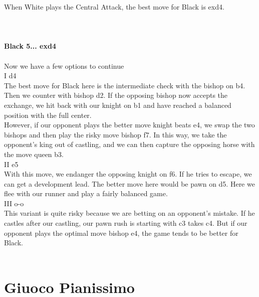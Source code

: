 \documentclass{article}
\begin{document}
When White plays the Central Attack, the best move for Black is exd4.\\
\\

\\
\\
\textbf{Black 5... exd4}\\
\\
Now we have a few options to continue\\I d4\\The best move for Black here is the intermediate check with the bishop on b4. Then we counter with bishop d2. If the opposing bishop now accepts the exchange, we hit back with our knight on b1 and have reached a balanced position with the full center.\\However, if our opponent plays the better move knight beats e4, we swap the two bishops and then play the risky move bishop f7. In this way, we take the opponent's king out of castling, and we can then capture the opposing horse with the move queen b3.\\II e5\\With this move, we endanger the opposing knight on f6. If he tries to escape, we can get a development lead. The better move here would be pawn on d5. Here we flee with our runner and play a fairly balanced game.\\III o-o\\This variant is quite risky because we are betting on an opponent's mistake. If he castles after our castling, our pawn rush is starting with c3 takes c4. But if our opponent plays the optimal move bishop e4, the game tends to be better for Black.\\
\\
\section{ Giuoco Pianissimo}
\end{document}
